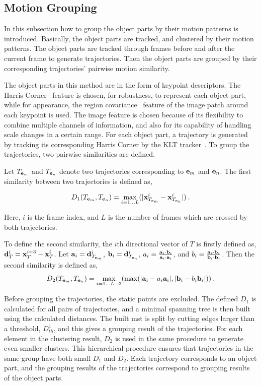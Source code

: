 \subsection{Motion Grouping}
In this subsection how to group the object parts by their motion patterns is introduced. Basically, the object parts are tracked, and clustered by their motion patterns. The object parts are tracked through frames before and after the current frame to generate trajectories. Then the object parts are grouped by their corresponding trajectories' pairwise motion similarity.

The object parts in this method are in the form of keypoint descriptors. The Harris Corner~\citep{harris} feature is chosen, for robustness, to represent each object part, while for appearance, the region covariance~\citep{regionc} feature of the image patch around each keypoint is used. The image feature is chosen because of its flexibility to combine multiple channels of information, and also for its capability of handling scale changes in a certain range.
For each object part, a trajectory is generated by tracking its corresponding Harris Corner by the KLT tracker~\citep{ij2}. To group the trajectories, two pairwise similarities are defined.

Let $T_{{\bf{e}}_m}$ and $T_{{\bf{e}}_n}$ denote two trajectories corresponding to ${{\bf{e}}_m}$ and ${{\bf{e}}_n}$. The first similarity between two trajectories is defined as,

\[
 {D_1}(T_{{\bf{e}}_m},T_{{\bf{e}}_n}) = \mathop {\max }\limits_{i=1...L} (|{\bf{x}}^i_{T_{{\bf{e}}_m}}-{\bf{x}}^i_{T_{{\bf{e}}_n}}|)\:.
\]

Here,  $i$ is the frame index, and $L$ is  the number of frames which are crossed by both trajectories.

To define the second similarity, the $i$th directional vector of $T$ is firstly defined as, ${\bf{d}}^i_T={\bf{x}}^{i+3}_{T}-{\bf{x}}^i_{T}$. Let ${\bf{a}}_i={\bf{d}}^i_{T_{{\bf{e}}_m}}$, ${\bf{b}}_i={\bf{d}}^i_{T_{{\bf{e}}_n}}$, $a_i=\frac{{{{\bf{a}}_i}\cdot{{\bf{b}}_i}}}{{{{\bf{a}}_i}\cdot{{\bf{a}}_i}}}$, and $b_i=\frac{{{{\bf{a}}_i}\cdot{{\bf{b}}_i}}}{{{{\bf{b}}_i}\cdot{{\bf{b}}_i}}}$. Then the second similarity is defined as,
\[
{D_2}(T_{{\bf{e}}_m},T_{{\bf{e}}_n})= \mathop {\max }\limits_{i=1...L-3} (\max (|{{\bf{a}}_i} - a_i {{\bf{a}}_i}|,|{{\bf{b}}_i} - b_i{{\bf{b}}_i}|))\:.
\]

Before grouping the trajectories, the static points are excluded. The defined $D_1$ is calculated for all pairs of trajectories, and a minimal spanning tree is then built using the calculated distances. The built mst is split by cutting edges larger than a threshold, $D^1_{th}$, and this gives a grouping result of the trajectories. For each element in the clustering result, $D_2$  is used in the same procedure to generate even smaller clusters. This hierarchical procedure ensures that trajectories in the same group have both small $D_1$ and $D_2$. Each trajectory corresponds to an object part, and the grouping results of the trajectories correspond to grouping results of the object parts.
